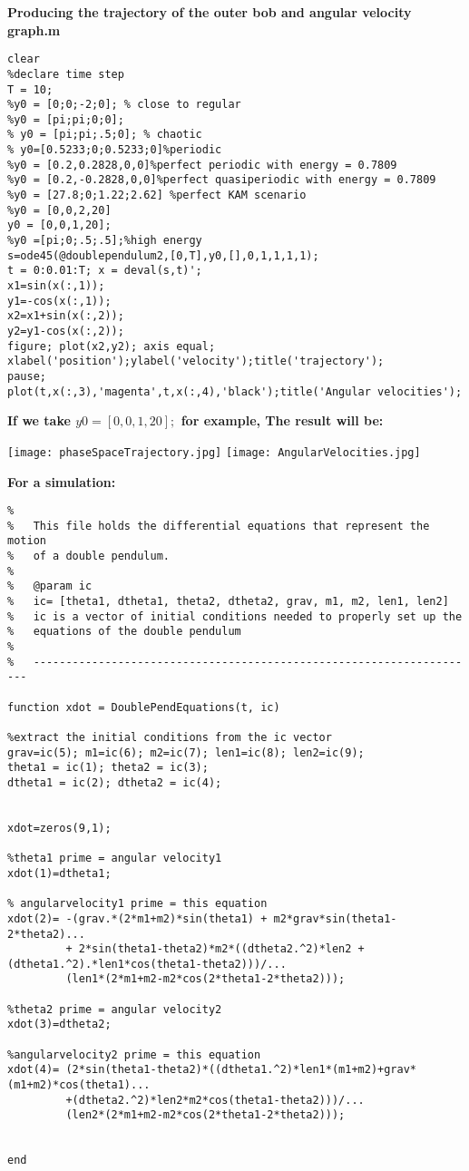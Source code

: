 \documentclass[11]{article}
\begin{document}
\noindent \textbf{Producing the trajectory of the outer bob and angular velocity graph.m}

\begin{verbatim}
clear
%declare time step
T = 10;
%y0 = [0;0;-2;0]; % close to regular
%y0 = [pi;pi;0;0];
% y0 = [pi;pi;.5;0]; % chaotic
% y0=[0.5233;0;0.5233;0]%periodic
%y0 = [0.2,0.2828,0,0]%perfect periodic with energy = 0.7809
%y0 = [0.2,-0.2828,0,0]%perfect quasiperiodic with energy = 0.7809
%y0 = [27.8;0;1.22;2.62] %perfect KAM scenario
%y0 = [0,0,2,20]
y0 = [0,0,1,20];
%y0 =[pi;0;.5;.5];%high energy
s=ode45(@doublependulum2,[0,T],y0,[],0,1,1,1,1);
t = 0:0.01:T; x = deval(s,t)';
x1=sin(x(:,1));
y1=-cos(x(:,1));
x2=x1+sin(x(:,2));
y2=y1-cos(x(:,2));
figure; plot(x2,y2); axis equal; xlabel('position');ylabel('velocity');title('trajectory');
pause;
plot(t,x(:,3),'magenta',t,x(:,4),'black');title('Angular velocities');
\end{verbatim}

\newpage

\noindent \textbf{If we take $y0 = [0,0,1,20];$ for example, The result will be:}

\begin{center}
\texttt{[image: phaseSpaceTrajectory.jpg]}
\texttt{[image: AngularVelocities.jpg]}
\end{center}

\newpage

\noindent \textbf{For a simulation:}

\begin{verbatim}
%
%   This file holds the differential equations that represent the motion
%   of a double pendulum.
%
%   @param ic
%   ic= [theta1, dtheta1, theta2, dtheta2, grav, m1, m2, len1, len2]
%   ic is a vector of initial conditions needed to properly set up the
%   equations of the double pendulum
%
%   ---------------------------------------------------------------------

function xdot = DoublePendEquations(t, ic)

%extract the initial conditions from the ic vector
grav=ic(5); m1=ic(6); m2=ic(7); len1=ic(8); len2=ic(9);
theta1 = ic(1); theta2 = ic(3);
dtheta1 = ic(2); dtheta2 = ic(4);


xdot=zeros(9,1);

%theta1 prime = angular velocity1
xdot(1)=dtheta1;

% angularvelocity1 prime = this equation 
xdot(2)= -(grav.*(2*m1+m2)*sin(theta1) + m2*grav*sin(theta1-2*theta2)...
         + 2*sin(theta1-theta2)*m2*((dtheta2.^2)*len2 + (dtheta1.^2).*len1*cos(theta1-theta2)))/...
         (len1*(2*m1+m2-m2*cos(2*theta1-2*theta2)));

%theta2 prime = angular velocity2
xdot(3)=dtheta2;

%angularvelocity2 prime = this equation
xdot(4)= (2*sin(theta1-theta2)*((dtheta1.^2)*len1*(m1+m2)+grav*(m1+m2)*cos(theta1)...
         +(dtheta2.^2)*len2*m2*cos(theta1-theta2)))/...
         (len2*(2*m1+m2-m2*cos(2*theta1-2*theta2)));
     
     
end
\end{verbatim}
\end{document}
